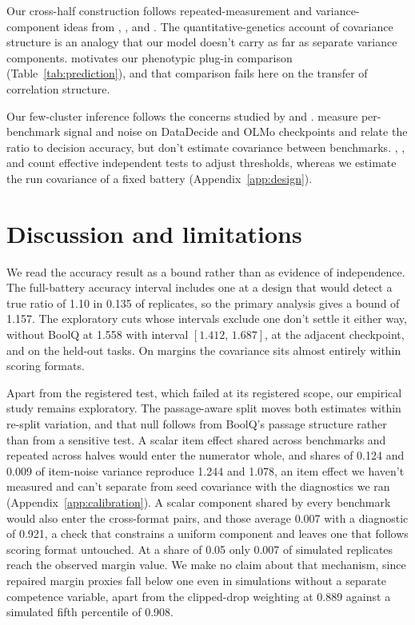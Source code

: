 \documentclass{article}
\newcommand{\ci}[2]{\ensuremath{[#1,\,#2]}}
\begin{document}
Our cross-half construction follows repeated-measurement and variance-component ideas from \citet{spearman1904}, \citet{cronbach1951}, and \citet{searle1992}. The quantitative-genetics account of covariance structure \citep{martin1977} is an analogy that our model doesn't carry as far as separate variance components. \citet{cheverud1988} motivates our phenotypic plug-in comparison (Table~\ref{tab:prediction}), and that comparison fails here on the transfer of correlation structure.

Our few-cluster inference follows the concerns studied by \citet{cameron2008} and \citet{mackinnon2017}. \citet{heineman2025} measure per-benchmark signal and noise on DataDecide and OLMo checkpoints and relate the ratio to decision accuracy, but don't estimate covariance between benchmarks. \citet{cheverud2001}, \citet{nyholt2004}, and \citet{li2005} count effective independent tests to adjust thresholds, whereas we estimate the run covariance of a fixed battery (Appendix~\ref{app:design}).

\section{Discussion and limitations}
We read the accuracy result as a bound rather than as evidence of independence. The full-battery accuracy interval includes one at a design that would detect a true ratio of 1.10 in 0.135 of replicates, so the primary analysis gives a bound of 1.157. The exploratory cuts whose intervals exclude one don't settle it either way, without BoolQ at 1.558 with interval \ci{1.412}{1.687}, at the adjacent checkpoint, and on the held-out tasks. On margins the covariance sits almost entirely within scoring formats.

Apart from the registered test, which failed at its registered scope, our empirical study remains exploratory. The passage-aware split moves both estimates within re-split variation, and that null follows from BoolQ's passage structure rather than from a sensitive test. A scalar item effect shared across benchmarks and repeated across halves would enter the numerator whole, and shares of 0.124 and 0.009 of item-noise variance reproduce 1.244 and 1.078, an item effect we haven't measured and can't separate from seed covariance with the diagnostics we ran (Appendix~\ref{app:calibration}). A scalar component shared by every benchmark would also enter the cross-format pairs, and those average 0.007 with a diagnostic of 0.921, a check that constrains a uniform component and leaves one that follows scoring format untouched. At a share of 0.05 only 0.007 of simulated replicates reach the observed margin value. We make no claim about that mechanism, since repaired margin proxies fall below one even in simulations without a separate competence variable, apart from the clipped-drop weighting at 0.889 against a simulated fifth percentile of 0.908.
\end{document}
